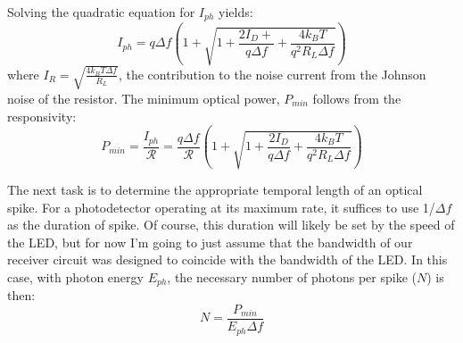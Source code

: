 \documentclass[onecolumn]{article}
\begin{document}
Solving the quadratic equation for $I_{ph}$ yields:
\begin{equation}
    I_{ph} = q\Delta f(1+\sqrt{1+\frac{2I_D+}{q\Delta f} +
    \frac{4k_BT}{q^2R_L\Delta f}})
\end{equation}
where $I_R = \sqrt{\frac{4k_{B}T\Delta f}{R_{L}}}$, the contribution to the noise current from the Johnson noise of the resistor. The minimum optical power, $P_{min}$ follows from the responsivity:
\begin{equation}
    P_{min} = \frac{I_{ph}}{\mathcal{R}}=
    \frac{q\Delta f}{\mathcal{R}}(1+\sqrt{1+\frac{2I_D}{q\Delta f} +
    \frac{4k_BT}{q^2R_L\Delta f}})
\end{equation}

The next task is to determine the appropriate temporal length of an optical spike. For a photodetector operating at its maximum rate, it suffices to use 1/$\Delta f$ as the duration of spike. Of course, this duration will likely be set by the speed of the LED, but for now I'm going to just assume that the bandwidth of our receiver circuit was designed to coincide with the bandwidth of the LED. In this case, with photon energy $E_{ph}$, the necessary number of photons per spike ($N$) is then:
\begin{equation}
    N = \frac{P_{min}}{E_{ph}\Delta f}
\end{equation}
\end{document}
